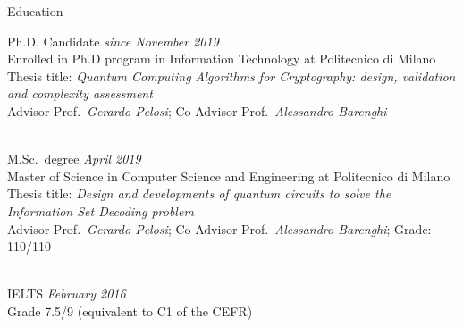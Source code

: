 \documentclass{resume} %
\newif\ifpublic{}
\begin{document}
\ifpublic{%
    \begin{mytabular}
      \row{Academic email}{simone.perriello@polimi.it}
    \end{mytabular}%
  }
\else{%
    \begin{mytabular}
    \end{mytabular}%
  }
\fi

\begin{rSection}{Education}
\item{Ph.D. Candidate} \hfill \textit{since November 2019}
\\ Enrolled in Ph.D program in Information Technology at Politecnico di Milano 
\\ Thesis title: \textit{Quantum Computing Algorithms for Cryptography: design, validation and complexity assessment}
\\ Advisor Prof.\ \textit{Gerardo Pelosi}; Co-Advisor Prof.\ \textit{Alessandro Barenghi}
\\
\\
\item{M.Sc.\ degree} \hfill \textit{April 2019} 
\\ Master of Science in Computer Science and Engineering at Politecnico di Milano
\\ Thesis title: \textit{Design and developments of quantum circuits to solve the Information Set Decoding problem}
\\ Advisor Prof.\ \textit{Gerardo Pelosi}; Co-Advisor Prof.\ \textit{Alessandro Barenghi}; Grade: 110/110
\\
\\
\item{IELTS} \hfill \textit{February 2016}
\\ Grade 7.5/9 (equivalent to C1 of the CEFR)
\\
\end{rSection}
\end{document}
